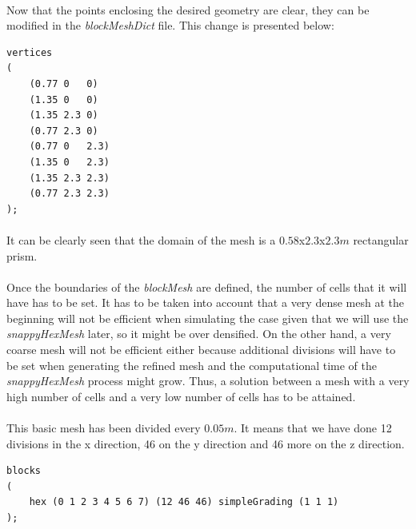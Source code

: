 \paragraph{}Now that the points enclosing the desired geometry are clear, they can be modified in the \textit{blockMeshDict} file. This change is presented below:

\begin{footnotesize}
\begin{verbatim}
vertices
(
    (0.77 0   0)
    (1.35 0   0)
    (1.35 2.3 0)
    (0.77 2.3 0)
    (0.77 0   2.3)
    (1.35 0   2.3)
    (1.35 2.3 2.3)
    (0.77 2.3 2.3)
);
\end{verbatim}
\end{footnotesize}

\paragraph{}It can be clearly seen that the domain of the mesh is a $0.58$x$2.3$x$2.3m$ rectangular prism.

\paragraph{}Once the boundaries of the \textit{blockMesh} are defined, the number of cells that it will have has to be set. It has to be taken into account that a very dense mesh at the beginning will not be efficient when simulating the case given that we will use the \textit{snappyHexMesh} later, so it might be over densified. On the other hand, a very coarse mesh will not be efficient either because additional divisions will have to be set when generating the refined mesh and the computational time of the \textit{snappyHexMesh} process might grow. Thus, a solution between a mesh with a very high number of cells and a very low number of cells has to be attained.

\paragraph{}This basic mesh has been divided every $0.05m$. It means that we have done 12 divisions in the x direction, 46 on the y direction and 46 more on the z direction. 

\begin{footnotesize}
\begin{verbatim}
blocks
(
    hex (0 1 2 3 4 5 6 7) (12 46 46) simpleGrading (1 1 1)
);
\end{verbatim}
\end{footnotesize}


